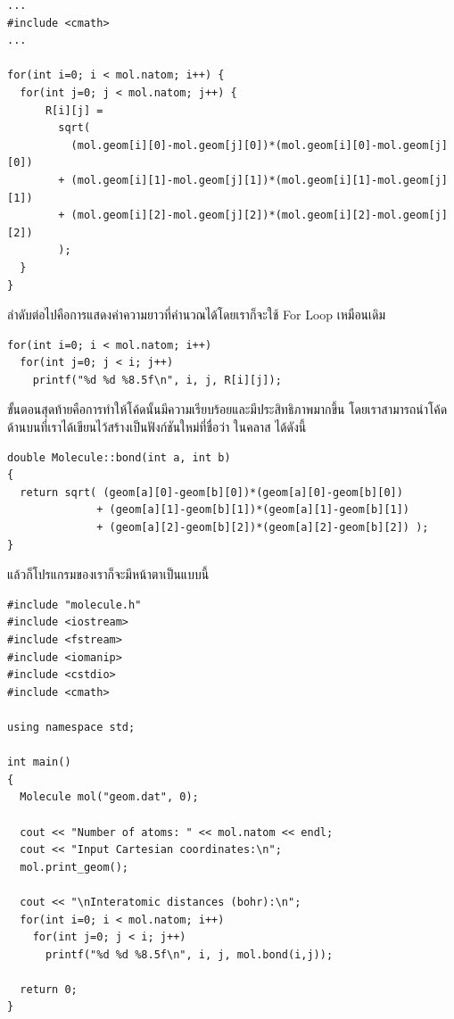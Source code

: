 \begin{lstlisting}[style=MyC++]
...
#include <cmath>
...

for(int i=0; i < mol.natom; i++) {
  for(int j=0; j < mol.natom; j++) {
      R[i][j] = 
        sqrt(
          (mol.geom[i][0]-mol.geom[j][0])*(mol.geom[i][0]-mol.geom[j][0])
        + (mol.geom[i][1]-mol.geom[j][1])*(mol.geom[i][1]-mol.geom[j][1])
        + (mol.geom[i][2]-mol.geom[j][2])*(mol.geom[i][2]-mol.geom[j][2]) 
        );
  }
}
\end{lstlisting}

\vspace{5pt}

ลำดับต่อไปคือการแสดงค่าความยาวที่คำนวณได้โดยเราก็จะใช้ For Loop เหมือนเดิม

\vspace{5pt}

\begin{lstlisting}[style=MyC++]
for(int i=0; i < mol.natom; i++)
  for(int j=0; j < i; j++)
    printf("%d %d %8.5f\n", i, j, R[i][j]);
\end{lstlisting}

\vspace{5pt}

ขั้นตอนสุดท้ายคือการทำให้โค้ดนั้นมีความเรียบร้อยและมีประสิทธิภาพมากขึ้น โดยเราสามารถนำโค้ดด้านบนที่เราได้เขียนไว้สร้างเป็นฟังก์ชันใหม่ที่ชื่อว่า
 ในคลาส  ได้ดังนี้

\vspace{5pt}

\begin{lstlisting}[style=MyC++]
double Molecule::bond(int a, int b)
{
  return sqrt( (geom[a][0]-geom[b][0])*(geom[a][0]-geom[b][0])
              + (geom[a][1]-geom[b][1])*(geom[a][1]-geom[b][1])
              + (geom[a][2]-geom[b][2])*(geom[a][2]-geom[b][2]) );
}
\end{lstlisting}

\vspace{5pt}

แล้วก็โปรแกรมของเราก็จะมีหน้าตาเป็นแบบนี้

\vspace{5pt}

\begin{lstlisting}[style=MyC++]
#include "molecule.h"
#include <iostream>
#include <fstream>
#include <iomanip>
#include <cstdio>
#include <cmath>

using namespace std;
  
int main()
{
  Molecule mol("geom.dat", 0);
  
  cout << "Number of atoms: " << mol.natom << endl;
  cout << "Input Cartesian coordinates:\n";
  mol.print_geom();
  
  cout << "\nInteratomic distances (bohr):\n";
  for(int i=0; i < mol.natom; i++)
    for(int j=0; j < i; j++)
      printf("%d %d %8.5f\n", i, j, mol.bond(i,j));
      
  return 0;
}
\end{lstlisting}

